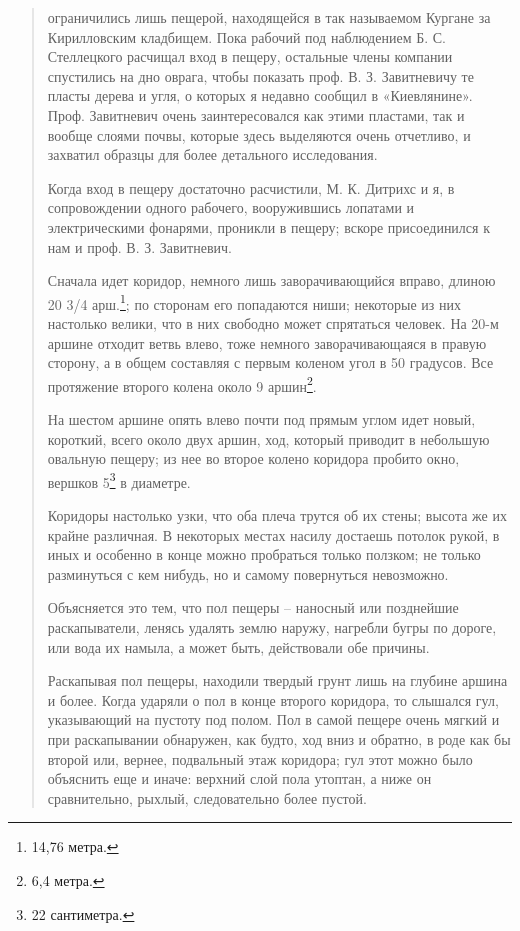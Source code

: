 \begin{quotation}
ограничились лишь пещерой, находящейся в так называемом Кургане за Кирилловским кладбищем. Пока рабочий под наблюдением Б. С. Стеллецкого расчищал вход в пещеру, остальные члены компании спустились на дно оврага, чтобы показать проф. В. З. Завитневичу те пласты дерева и угля, о которых я недавно сообщил в «Киевлянине». Проф. Завитневич очень заинтересовался как этими пластами, так и вообще слоями почвы, которые здесь выделяются очень отчетливо, и захватил образцы для более детального исследования.

Когда вход в пещеру достаточно расчистили, М. К. Дитрихс и я, в сопровождении одного рабочего, вооружившись лопатами и электрическими фонарями, проникли в пещеру; вскоре присоединился к нам и проф. В. З. Завитневич.

Сначала идет коридор, немного лишь заворачивающийся вправо, длиною 20 3/4 арш.\footnote{14,76 метра.}; по сторонам его попадаются ниши; некоторые из них настолько велики, что в них свободно может спрятаться человек. На 20-м аршине отходит ветвь влево, тоже немного заворачивающаяся в правую сторону, а в общем составляя с первым коленом угол в 50 градусов. Все протяжение второго колена около 9 аршин\footnote{6,4 метра.}.

На шестом аршине опять влево почти под прямым углом идет новый, короткий, всего около двух аршин, ход, который приводит в небольшую овальную пещеру; из нее во второе колено коридора пробито окно, вершков 5\footnote{22 сантиметра.} в диаметре.

Коридоры настолько узки, что оба плеча трутся об их стены; высота же их крайне различная. В некоторых местах насилу достаешь потолок рукой, в иных и особенно в конце можно пробраться только ползком; не только разминуться с кем нибудь, но и самому повернуться невозможно.

Объясняется это тем, что пол пещеры – наносный или позднейшие раскапыватели, ленясь удалять землю наружу, нагребли бугры по дороге, или вода их намыла, а может быть, действовали обе причины.

Раскапывая пол пещеры, находили твердый грунт лишь на глубине аршина и более. Когда ударяли о пол в конце второго коридора, то слышался гул, указывающий на пустоту под полом. Пол в самой пещере очень мягкий и при раскапывании обнаружен, как будто, ход вниз и обратно, в роде как бы второй или, вернее, подвальный этаж коридора; гул этот можно было объяснить еще и иначе: верхний слой пола утоптан, а ниже он сравнительно, рыхлый, следовательно более пустой.


\end{quotation}
